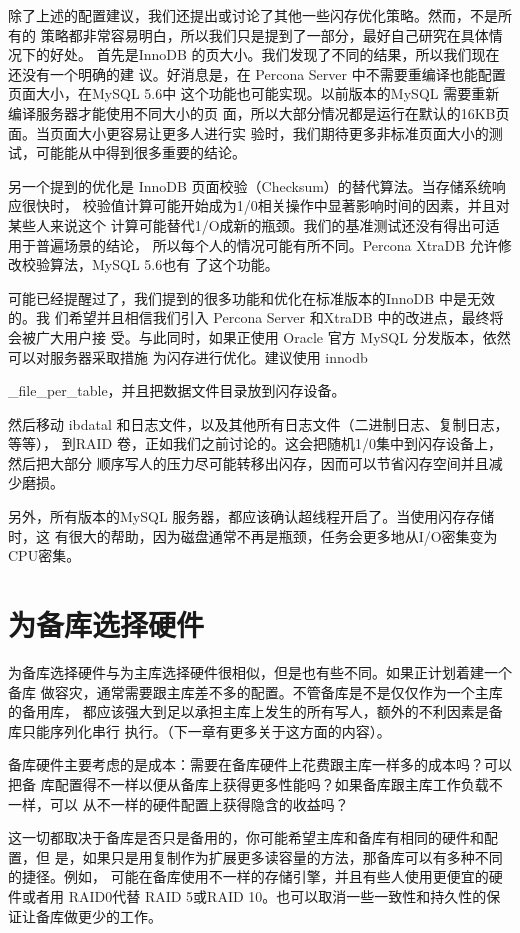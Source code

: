 除了上述的配置建议，我们还提出或讨论了其他一些闪存优化策略。然而，不是所有的
策略都非常容易明白，所以我们只是提到了一部分，最好自己研究在具体情况下的好处。
首先是InnoDB 的页大小。我们发现了不同的结果，所以我们现在还没有一个明确的建
议。好消息是，在 Percona Server 中不需要重编译也能配置页面大小，在MySQL 5.6中
这个功能也可能实现。以前版本的MySQL 需要重新编译服务器才能使用不同大小的页
面，所以大部分情况都是运行在默认的16KB页面。当页面大小更容易让更多人进行实
验时，我们期待更多非标准页面大小的测试，可能能从中得到很多重要的结论。

另一个提到的优化是 InnoDB 页面校验（Checksum）的替代算法。当存储系统响应很快时，
校验值计算可能开始成为1/0相关操作中显著影响时间的因素，并且对某些人来说这个
计算可能替代1/O成新的瓶颈。我们的基准测试还没有得出可适用于普遍场景的结论，
所以每个人的情况可能有所不同。Percona XtraDB 允许修改校验算法，MySQL 5.6也有
了这个功能。

可能已经提醒过了，我们提到的很多功能和优化在标准版本的InnoDB 中是无效的。我
们希望并且相信我们引入 Percona Server 和XtraDB 中的改进点，最终将会被广大用户接
受。与此同时，如果正使用 Oracle 官方 MySQL 分发版本，依然可以对服务器采取措施
为闪存进行优化。建议使用 innodb

\_file\_per\_table，并且把数据文件目录放到闪存设备。

然后移动 ibdatal 和日志文件，以及其他所有日志文件（二进制日志、复制日志，等等），
到RAID 卷，正如我们之前讨论的。这会把随机1/0集中到闪存设备上，然后把大部分
顺序写人的压力尽可能转移出闪存，因而可以节省闪存空间并且减少磨损。

另外，所有版本的MySQL 服务器，都应该确认超线程开启了。当使用闪存存储时，这
有很大的帮助，因为磁盘通常不再是瓶颈，任务会更多地从I/O密集变为CPU密集。

\section{为备库选择硬件}
为备库选择硬件与为主库选择硬件很相似，但是也有些不同。如果正计划着建一个备库
做容灾，通常需要跟主库差不多的配置。不管备库是不是仅仅作为一个主库的备用库，
都应该强大到足以承担主库上发生的所有写人，额外的不利因素是备库只能序列化串行
执行。（下一章有更多关于这方面的内容）。

备库硬件主要考虑的是成本：需要在备库硬件上花费跟主库一样多的成本吗？可以把备
库配置得不一样以便从备库上获得更多性能吗？如果备库跟主库工作负载不一样，可以
从不一样的硬件配置上获得隐含的收益吗？

这一切都取决于备库是否只是备用的，你可能希望主库和备库有相同的硬件和配置，但
是，如果只是用复制作为扩展更多读容量的方法，那备库可以有多种不同的捷径。例如，
可能在备库使用不一样的存储引擎，并且有些人使用更便宜的硬件或者用 RAID0代替
RAID 5或RAID 10。也可以取消一些一致性和持久性的保证让备库做更少的工作。


